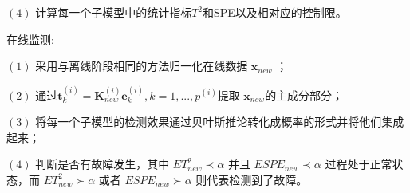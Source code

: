 $(4)$ 计算每一个子模型中的统计指标$T^2$和SPE以及相对应的控制限。

在线监测:

$(1)$ 采用与离线阶段相同的方法归一化在线数据 $\textbf{x}_{new}$ ；

$(2)$ 通过$\textbf{t}^{(i)}_{k}=\textbf{K}_{new}^{(i)}\textbf{e}^{(i)}_{k} , k=1,...,p^{(i)}$提取 $\textbf{x}_{new}$的主成分部分；

$(3)$ 将每一个子模型的检测效果通过贝叶斯推论转化成概率的形式并将他们集成起来；

$(4)$ 判断是否有故障发生，其中 $ET^2_{new}\prec\alpha$ 并且 $ESPE_{new}\prec\alpha$ 过程处于正常状态，而 $ET^2_{new}\succ\alpha$ 或者 $ESPE_{new}\succ\alpha$ 则代表检测到了故障。

